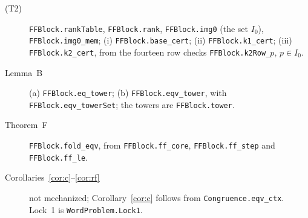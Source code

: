 \documentclass[11pt]{amsart}
\theoremstyle{definition}
\begin{document}
{\begin{description}
\item[(T2)] \texttt{FFBlock.rankTable}, \texttt{FFBlock.rank}, \texttt{FFBlock.img0} (the set $I_0$),
\texttt{FFBlock.img0\_mem}; (i) \texttt{FFBlock.base\_cert}; (ii) \texttt{FFBlock.k1\_cert}; (iii)
\texttt{FFBlock.k2\_cert}, from the fourteen row checks \texttt{FFBlock.k2Row\_}$p$, $p\in I_0$.
\item[Lemma~B] (a) \texttt{FFBlock.eq\_tower}; (b) \texttt{FFBlock.eqv\_tower}, with
\texttt{FFBlock.eqv\_towerSet}; the towers are \texttt{FFBlock.tower}.
\item[Theorem~F] \texttt{FFBlock.fold\_eqv}, from \texttt{FFBlock.ff\_core}, \texttt{FFBlock.ff\_step}
and \texttt{FFBlock.ff\_le}.
\item[Corollaries~\ref{cor:c}--\ref{cor:rf}] not mechanized; Corollary~\ref{cor:c} follows from
\texttt{Congruence.eqv\_ctx}. Lock~1 is \texttt{WordProblem.Lock1}.
\end{description}
\par}



\end{document}
